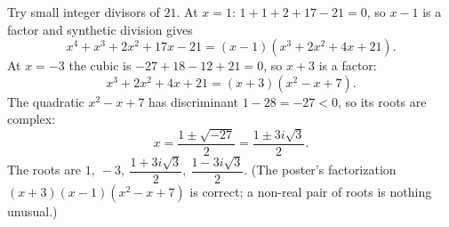 Try small integer divisors of $21$. At $x=1$: $1+1+2+17-21=0$, so $x-1$ is a factor and synthetic division gives
\[x^4+x^3+2x^2+17x-21=(x-1)(x^3+2x^2+4x+21).\]
At $x=-3$ the cubic is $-27+18-12+21=0$, so $x+3$ is a factor:
\[x^3+2x^2+4x+21=(x+3)(x^2-x+7).\]
The quadratic $x^2-x+7$ has discriminant $1-28=-27<0$, so its roots are complex:
\[x=\dfrac{1\pm\sqrt{-27}}{2}=\dfrac{1\pm3i\sqrt3}{2}.\]
The roots are $\boxed{1,\ -3,\ \dfrac{1+3i\sqrt3}{2},\ \dfrac{1-3i\sqrt3}{2}}$. (The poster's factorization $(x+3)(x-1)(x^2-x+7)$ is correct; a non-real pair of roots is nothing unusual.)
